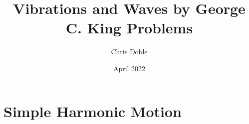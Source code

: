 \documentclass{article}
\title{Vibrations and Waves by George C. King Problems}
\author{Chris Doble}
\date{April 2022}
\begin{document}
\maketitle

\tableofcontents

\section{Simple Harmonic Motion}
\end{document}
